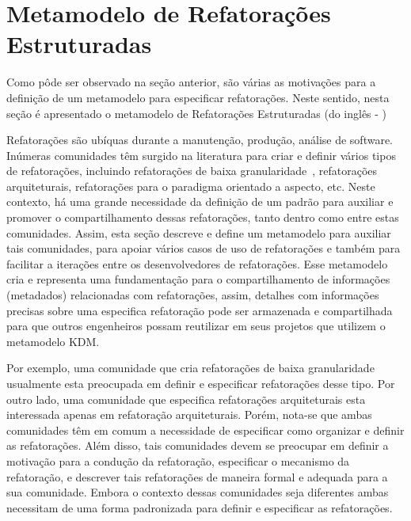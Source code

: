 
\section{Metamodelo de Refatorações Estruturadas} %
\label{sec:meta_modelo_de_refatora_es_estruturadas_srm_do_ingl_s_structured refactoring meta-model_}

Como pôde ser observado na seção anterior, são várias as motivações para a definição de um metamodelo para especificar refatorações. Neste sentido, nesta seção é apresentado o metamodelo de Refatorações Estruturadas (do inglês - )

Refatorações são ubíquas durante a manutenção, produção, análise de software. Inúmeras comunidades têm surgido na literatura para criar e definir vários tipos de refatorações, incluindo refatorações de baixa granularidade~\cite{Fowler1999, Demeyer1, Demeyer2}, refatorações arquiteturais, refatorações para o paradigma orientado a aspecto, etc. Neste contexto, há uma grande necessidade da definição de um padrão para auxiliar e promover o compartilhamento dessas refatorações, tanto dentro como entre estas comunidades. Assim, esta seção descreve e define um metamodelo para auxiliar tais comunidades, para apoiar vários casos de uso de refatorações e também para facilitar a iterações entre os desenvolvedores de refatorações. Esse metamodelo cria e representa uma fundamentação para o compartilhamento de informações (metadados) relacionadas com refatorações, assim, detalhes com informações precisas sobre uma especifica refatoração pode ser armazenada e compartilhada para que outros engenheiros possam reutilizar em seus projetos que utilizem o metamodelo KDM.

Por exemplo, uma comunidade que cria refatorações de baixa granularidade usualmente esta preocupada em definir e especificar refatorações desse tipo. Por outro lado, uma comunidade que especifica refatorações arquiteturais esta interessada apenas em refatoração arquiteturais. Porém, nota-se que ambas comunidades têm em comum a necessidade de especificar como organizar e definir as refatorações. Além disso, tais comunidades devem se preocupar em definir a motivação para a condução da refatoração, especificar o mecanismo da refatoração, e descrever tais refatorações de maneira formal e adequada para a sua comunidade. Embora o contexto dessas comunidades seja diferentes ambas necessitam de uma forma padronizada para definir e especificar as refatorações. 

